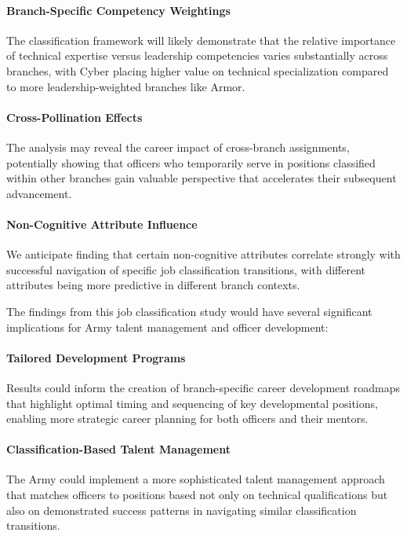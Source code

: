 \documentclass[../main.tex]{subfiles}
\begin{document}
\paragraph{Branch-Specific Competency Weightings} The classification framework will likely demonstrate that the relative importance of technical expertise versus leadership competencies varies substantially across branches, with Cyber placing higher value on technical specialization compared to more leadership-weighted branches like Armor.

\paragraph{Cross-Pollination Effects} The analysis may reveal the career impact of cross-branch assignments, potentially showing that officers who temporarily serve in positions classified within other branches gain valuable perspective that accelerates their subsequent advancement.

\paragraph{Non-Cognitive Attribute Influence} We anticipate finding that certain non-cognitive attributes correlate strongly with successful navigation of specific job classification transitions, with different attributes being more predictive in different branch contexts.

The findings from this job classification study would have several significant implications for Army talent management and officer development:

\paragraph{Tailored Development Programs} Results could inform the creation of branch-specific career development roadmaps that highlight optimal timing and sequencing of key developmental positions, enabling more strategic career planning for both officers and their mentors.

\paragraph{Classification-Based Talent Management} The Army could implement a more sophisticated talent management approach that matches officers to positions based not only on technical qualifications but also on demonstrated success patterns in navigating similar classification transitions.
\end{document}
